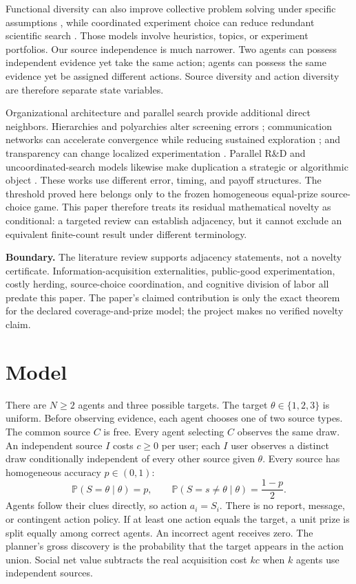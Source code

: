 \documentclass[11pt]{article}
\newcommand{\Prb}{\mathbb{P}}
\newcommand{\Boundary}[1]{\par\noindent\textbf{Boundary.} #1\par}
\begin{document}
Functional diversity can also improve collective problem solving under specific
assumptions \citep{HongPage2004}, while coordinated experiment choice can reduce
redundant scientific search \citep{RzhetskyEtAl2015}. Those models involve
heuristics, topics, or experiment portfolios. Our source independence is much
narrower. Two agents can possess independent evidence yet take the same action;
agents can possess the same evidence yet be assigned different actions. Source
diversity and action diversity are therefore separate state variables.

Organizational architecture and parallel search provide additional direct
neighbors. Hierarchies and polyarchies alter screening errors
\citep{SahStiglitz1986}; communication networks can accelerate convergence while
reducing sustained exploration \citep{LazerFriedman2007}; and transparency can
change localized experimentation \citep{Bernstein2012}. Parallel R\&D and
uncoordinated-search models likewise make duplication a strategic or algorithmic
object \citep{BranderAmitAntweiler2002,KormanRodeh2020}. These works use
different error, timing, and payoff structures. The threshold proved here
belongs only to the frozen homogeneous equal-prize source-choice game. This
paper therefore treats its residual mathematical novelty as conditional: a
targeted review can establish adjacency, but it cannot exclude an equivalent
finite-count result under different terminology.

\Boundary{The literature review supports adjacency statements, not a novelty
certificate. Information-acquisition externalities, public-good experimentation,
costly herding, source-choice coordination, and cognitive division of labor all
predate this paper. The paper's claimed contribution is only the exact theorem
for the declared coverage-and-prize model; the project makes no verified
novelty claim.}

\section{Model}

There are $N\ge2$ agents and three possible targets. The target
$\theta\in\{1,2,3\}$ is uniform. Before observing evidence, each agent chooses
one of two source types. The common source $C$ is free. Every agent selecting
$C$ observes the same draw. An independent source $I$ costs $c\ge0$ per user;
each $I$ user observes a distinct draw conditionally independent of every other
source given $\theta$. Every source has homogeneous accuracy $p\in(0,1)$:
\[
 \Prb(S=\theta\mid\theta)=p,
 \qquad
 \Prb(S=s\ne\theta\mid\theta)=\frac{1-p}{2}.
\]
Agents follow their clues directly, so action $a_i=S_i$. There is no report,
message, or contingent action policy. If at least one action equals the target,
a unit prize is split equally among correct agents. An incorrect agent receives
zero. The planner's gross discovery is the probability that the target appears
in the action union. Social net value subtracts the real acquisition cost $kc$
when $k$ agents use independent sources.
\end{document}
